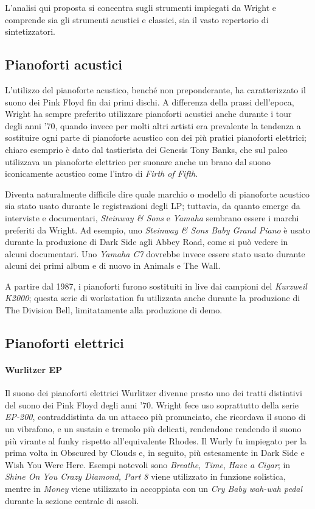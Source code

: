 \documentclass[class=book, crop=false, oneside, 12pt]{standalone}
\begin{document}
    L'analisi qui proposta si concentra sugli strumenti impiegati da Wright e comprende sia gli strumenti acustici e classici, sia il vasto repertorio di sintetizzatori.
    
    \subsection{Pianoforti acustici}
    L'utilizzo del pianoforte acustico, benché non preponderante, ha caratterizzato il suono dei Pink Floyd fin dai primi dischi. A differenza della prassi dell'epoca, Wright ha sempre preferito utilizzare pianoforti acustici anche durante i tour degli anni '70, quando invece per molti altri artisti era prevalente la tendenza a sostituire ogni parte di pianoforte acustico con dei più pratici pianoforti elettrici; chiaro esemprio è dato dal tastierista dei Genesis Tony Banks, che sul palco utilizzava un pianoforte elettrico per suonare anche un brano dal suono iconicamente acustico come l'intro di \emph{Firth of Fifth}. 
    
    Diventa naturalmente difficile dire quale marchio o modello di pianoforte acustico sia stato usato durante le registrazioni degli LP; tuttavia, da quanto emerge da interviste e documentari, \emph{Steinway \& Sons} e \emph{Yamaha} sembrano essere i marchi preferiti da Wright. Ad esempio, uno \emph{Steinway \& Sons Baby Grand Piano} è usato durante la produzione di Dark Side agli Abbey Road, come si può vedere in alcuni documentari. Uno \emph{Yamaha C7} dovrebbe invece essere stato usato durante alcuni dei primi album e di nuovo in Animals e The Wall.

    A partire dal 1987, i pianoforti furono sostituiti in live dai campioni del \emph{Kurzweil K2000}; questa serie di workstation fu utilizzata anche durante la produzione di The Division Bell, limitatamente alla produzione di demo.

    \subsection{Pianoforti elettrici}

    \paragraph{Wurlitzer EP}
    Il suono dei pianoforti elettrici Wurlitzer divenne presto uno dei tratti distintivi del suono dei Pink Floyd degli anni '70. Wright fece uso soprattutto della serie \emph{EP-200}, contraddistinta da un attacco più pronunciato, che ricordava il suono di un vibrafono, e un sustain e tremolo più delicati, rendendone rendendo il suono più virante al funky rispetto all'equivalente Rhodes. Il Wurly fu impiegato per la prima volta in Obscured by Clouds e, in seguito, più estesamente in Dark Side e Wish You Were Here. Esempi notevoli sono \emph{Breathe}, \emph{Time}, \emph{Have a Cigar}; in \emph{Shine On You Crazy Diamond, Part 8} viene utilizzato in funzione solistica, mentre in \emph{Money} viene utilizzato in accoppiata con un \emph{Cry Baby wah-wah pedal} durante la sezione centrale di assoli. 
\end{document}
